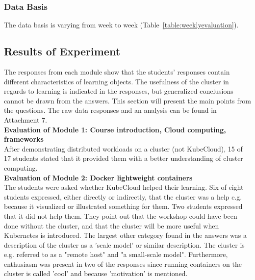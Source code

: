 \subsubsection*{Data Basis}
The data basis is varying from week to week (Table~\ref{table:weeklyevaluation}).


\subsection*{Results of Experiment}
The responses from each module show that the students' responses contain different characteristics of learning objects. The usefulness of the cluster in regards to learning is indicated in the responses, but generalized conclusions cannot be drawn from the answers. This section will present the main points from the questions. The raw data responses and an analysis can be found in Attachment 7. \\

\noindent
\textbf{Evaluation of Module 1: Course introduction, Cloud computing, frameworks} \\
After demonstrating distributed workloads on a cluster (not KubeCloud), 15 of 17 students stated that it provided them with a better understanding of cluster computing. \\

\noindent
\textbf{Evaluation of Module 2: Docker lightweight containers} \\
The students were asked whether KubeCloud helped their learning. Six of eight students expressed, either directly or indirectly, that the cluster was a help e.g. because it visualized or illustrated something for them. Two students expressed that it did not help them. They point out that the workshop could have been done without the cluster, and that the cluster will be more useful when Kubernetes is introduced. The largest other category found in the answers was a description of the cluster as a 'scale model' or similar description. The cluster is e.g. referred to as a "remote host" and "a small-scale model". Furthermore, enthusiasm was present in two of the responses since running containers on the cluster is called 'cool' and because 'motivation' is mentioned. \\

